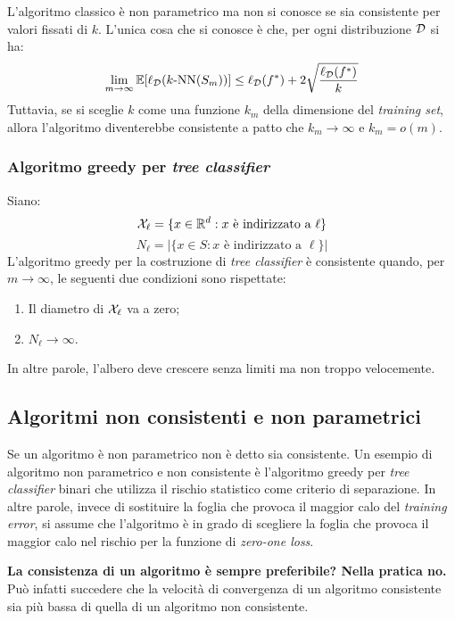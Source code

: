 \subsubsection{\texorpdfstring{\kNN}{kNN}}
L'algoritmo \kNN classico è non parametrico ma non si conosce se sia
consistente per valori fissati di $k$. L'unica cosa che si conosce è che,
per ogni distribuzione $\mathcal{D}$ si ha:
$$ \lim_{m\rightarrow\infty} \mathbb{E}[\ell_{\mathcal{D}}(k\text{-NN}(S_m))]\leq
\ell_{\mathcal{D}}(f^*)+2\sqrt{\frac{\ell_{\mathcal{D}}(f^*)}{k}} $$
Tuttavia, se si sceglie $k$ come una funzione $k_m$ della dimensione del
\textit{training set}, allora l'algoritmo diventerebbe consistente a patto
che $k_m \rightarrow\infty$ e $k_m=o(m)$.

\subsubsection{Algoritmo greedy per \textit{tree classifier}}
Siano: 
$$\mathcal{X}_\ell=\{x\in\mathbb{R}^d:\text{$x$ è indirizzato a $\ell$}\}$$
$$ N_\ell = |\{x\in S:\text{$x$ è indirizzato a $\ell$}\}| $$
L'algoritmo greedy per la costruzione di \textit{tree classifier} è consistente
quando, per $m\rightarrow\infty$, le seguenti due condizioni sono rispettate:
\begin{enumerate}
    \item Il diametro di $\mathcal{X}_\ell$ va a zero;
    \item $N_\ell\rightarrow\infty$.
\end{enumerate}
In altre parole, l'albero deve crescere senza limiti ma non troppo velocemente.

\subsection{Algoritmi non consistenti e non parametrici}
Se un algoritmo è non parametrico non è detto sia consistente. Un esempio di
algoritmo non parametrico e non consistente è l'algoritmo greedy per
\textit{tree classifier} binari che utilizza il rischio statistico come
criterio di separazione. In altre parole, invece di sostituire la foglia che
provoca il maggior calo del \textit{training error}, si assume che l'algoritmo
è in grado di scegliere la foglia che provoca il maggior calo nel rischio per
la funzione di \textit{zero-one loss}.

\textbf{La consistenza di un algoritmo è sempre preferibile? Nella pratica no.}
Può infatti succedere che la velocità di convergenza di un algoritmo consistente
sia più bassa di quella di un algoritmo non consistente. 

